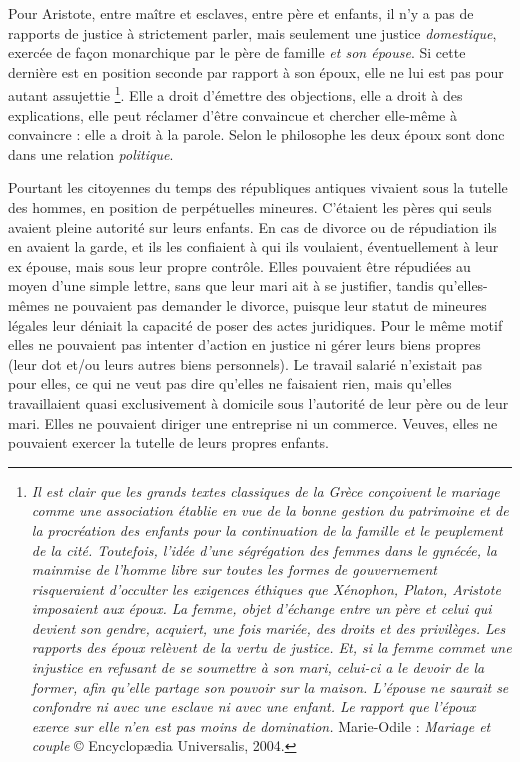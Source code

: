 Pour Aristote, entre maître et esclaves, entre père et enfants, il n'y
a pas de rapports de justice à strictement parler, mais seulement une
justice \emph{domestique}, exercée de façon monarchique par le père de famille \emph{et
son épouse}. Si cette dernière est en position seconde par rapport à son
époux, elle ne lui est pas pour autant assujettie%
\footnote{{\emph{Il est clair que les grands textes classiques de la Grèce conçoivent le mariage comme une association établie en vue de la bonne gestion du patrimoine et de la procréation des enfants pour la continuation de la famille et le peuplement de la cité. Toutefois, l'idée d'une ségrégation des femmes dans le gynécée, la mainmise de l'homme libre sur toutes les formes de gouvernement risqueraient d'occulter les exigences éthiques que Xénophon, Platon, Aristote imposaient aux époux. La femme, objet d'échange entre un père et celui qui devient son gendre, acquiert, une fois mariée, des droits et des privilèges. Les rapports des époux relèvent de la vertu de justice. Et, si la femme commet une injustice en refusant de se soumettre à son mari, celui-ci a le devoir de la former, afin qu'elle partage son pouvoir sur la maison. L'épouse ne saurait se confondre ni avec une esclave ni avec une enfant. Le rapport que l'époux exerce sur elle n'en est pas moins de domination.}}
Marie-Odile  : \emph{Mariage et couple} © Encyclopædia Universalis, 2004.}.
Elle a droit
d'émettre des objections, elle a droit à des explications, elle peut
réclamer d'être convaincue et chercher elle-même à convaincre : elle a
droit à la parole. Selon le philosophe les deux époux sont donc dans
une relation \emph{politique}. 

Pourtant les citoyennes du temps des républiques antiques vivaient sous la
tutelle des hommes, en position de perpétuelles mineures. C'étaient les pères qui seuls avaient pleine autorité
sur leurs enfants. En cas de divorce ou de répudiation ils en avaient la
garde, et ils les confiaient à qui ils voulaient, éventuellement à leur ex
épouse, mais sous leur propre contrôle. Elles pouvaient
être répudiées au moyen d'une simple lettre, sans que leur mari ait
à se justifier, tandis qu'elles-mêmes ne pouvaient pas demander le divorce,
puisque leur statut de mineures légales leur déniait la capacité de poser des actes juridiques. Pour le même motif elles ne pouvaient
pas intenter d'action en justice ni gérer leurs biens propres
(leur dot et/ou leurs autres biens personnels). Le travail salarié
n'existait pas pour elles, ce qui ne veut pas dire qu'elles ne faisaient
rien, mais qu'elles travaillaient quasi exclusivement
à domicile sous l'autorité de leur père ou de leur mari.  Elles ne pouvaient
diriger une entreprise ni un commerce. Veuves, elles ne pouvaient
exercer la tutelle de leurs propres enfants. 

